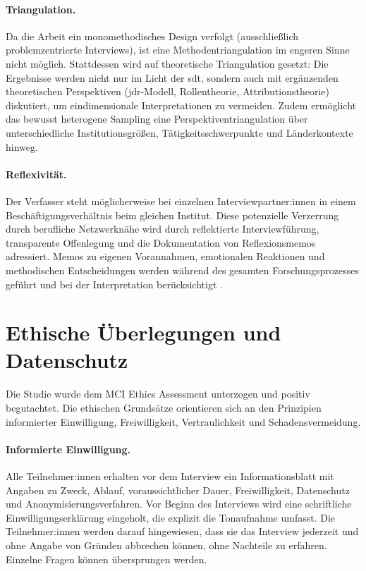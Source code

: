 \paragraph{Triangulation.} Da die Arbeit ein monomethodisches Design verfolgt (ausschließlich problemzentrierte Interviews), ist eine Methodentriangulation im engeren Sinne nicht möglich. Stattdessen wird auf theoretische Triangulation gesetzt: Die Ergebnisse werden nicht nur im Licht der \gls{sdt}, sondern auch mit ergänzenden theoretischen Perspektiven (\acrshort{jdr}-Modell, Rollentheorie, Attributionstheorie) diskutiert, um eindimensionale Interpretationen zu vermeiden. Zudem ermöglicht das bewusst heterogene Sampling eine Perspektiventriangulation über unterschiedliche Institutionsgrößen, Tätigkeitsschwerpunkte und Länderkontexte hinweg.

\paragraph{Reflexivität.} Der Verfasser steht möglicherweise bei einzelnen Interviewpartner:innen in einem Beschäftigungsverhältnis beim gleichen Institut. Diese potenzielle Verzerrung durch berufliche Netzwerknähe wird durch reflektierte Interviewführung, transparente Offenlegung und die Dokumentation von Reflexionsmemos adressiert. Memos zu eigenen Vorannahmen, emotionalen Reaktionen und methodischen Entscheidungen werden während des gesamten Forschungsprozesses geführt und bei der Interpretation berücksichtigt \parencite{przyborski2021}.
\section{Ethische Überlegungen und Datenschutz}
\label{met:ethik}
Die Studie wurde dem MCI Ethics Assessment unterzogen und positiv begutachtet. Die ethischen Grundsätze orientieren sich an den Prinzipien informierter Einwilligung, Freiwilligkeit, Vertraulichkeit und Schadensvermeidung.

\paragraph{Informierte Einwilligung.} Alle Teilnehmer:innen erhalten vor dem Interview ein Informationsblatt mit Angaben zu Zweck, Ablauf, voraussichtlicher Dauer, Freiwilligkeit, Datenschutz und Anonymisierungsverfahren. Vor Beginn des Interviews wird eine schriftliche Einwilligungserklärung eingeholt, die explizit die Tonaufnahme umfasst. Die Teilnehmer:innen werden darauf hingewiesen, dass sie das Interview jederzeit und ohne Angabe von Gründen abbrechen können, ohne Nachteile zu erfahren. Einzelne Fragen können übersprungen werden.

